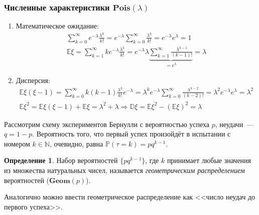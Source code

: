 \documentclass[oneside,final,14pt]{extreport}
\newcommand\myprob[1]{{\mathbb{P}(#1)}}
\theoremstyle{plain}
\theoremstyle{definition}
\newtheorem*{defn}{Определение}
\theoremstyle{named}
\begin{document}
\subsubsection{Численные характеристики $\mathbf{Pois}(\lambda)$}
\begin{enumerate}
    \item Математическое ожидание:
    \begin{align*}
        \sum\limits_{k=0}^{\infty} e^{-\lambda} \frac{\lambda^k}{k!} = e^{-\lambda} \sum\limits_{k=0}^{\infty} \frac{\lambda^k}{k!} = e^{-\lambda} e^\lambda = 1 \\
        \mathbb{E}\xi = \sum\limits_{k=1}^{\infty} k e^{-\lambda} \frac{\lambda^k}{k!} = e^{-\lambda} \lambda \underbrace{\sum\limits_{k=1}^{\infty} \frac{\lambda^{k-1}}{(k - 1)!}}_{ = e^\lambda} = \lambda
    \end{align*}
    \item Дисперсия:
    \begin{align*}
        \mathbb{E}\xi(\xi - 1) = \sum\limits_{k=0}^{\infty} k (k - 1) \frac{\lambda^k}{k!} e^{-\lambda}  = \lambda^k e^{-\lambda} \sum\limits_{k=0}^{\infty} \frac{\lambda^{k-2}}{(k-2)!} = \lambda^2 e^{-\lambda} e^\lambda = \lambda^2 \\
        \mathbb{E}\xi^2 = \mathbb{E}\xi(\xi - 1) + \mathbb{E}\xi = \lambda^2 + \lambda \Rightarrow \mathbb{D}\xi = \mathbb{E}\xi^2 - (\mathbb{E}\xi)^2 = \lambda
    \end{align*}
\end{enumerate}

Рассмотрим схему экспериментов Бернулли с вероятностью успеха $p$, неудачи~--- $q = 1 - p$. Вероятность того, что первый успех произойдёт в испытании с номером $k \in \mathbb{N}$, очевидно, равна $\myprob{\tau = k} = pq^{k-1}$.

\begin{defn}
    Набор вероятностей $\{p q^{k-1}\}$, где $k$ принимает любые значения из множества натуральных чисел, называется {\it геометрическим распределением} вероятностей ($\mathbf{Geom}(p)$). 
\end{defn}

Аналогично можно ввести геометрическое распределение как <<число неудач до первого успеха>>.
\end{document}
